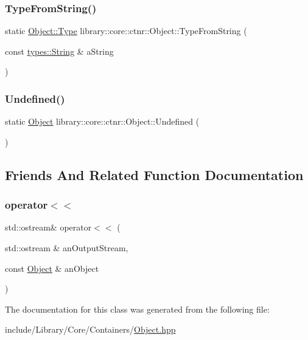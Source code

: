 \subsubsection{\texorpdfstring{Type\+From\+String()}{TypeFromString()}}
{\footnotesize\ttfamily static \hyperlink{classlibrary_1_1core_1_1ctnr_1_1Object_a0766006ad111133d70349019551b31d6}{Object\+::\+Type} library\+::core\+::ctnr\+::\+Object\+::\+Type\+From\+String (\begin{DoxyParamCaption}\item[{const \hyperlink{classlibrary_1_1core_1_1types_1_1String}{types\+::\+String} \&}]{a\+String }\end{DoxyParamCaption})\hspace{0.3cm}{\ttfamily [static]}}

\mbox{\label{classlibrary_1_1core_1_1ctnr_1_1Object_a44ab889938fb505237c87feedd6a6770}} 
\subsubsection{\texorpdfstring{Undefined()}{Undefined()}}
{\footnotesize\ttfamily static \hyperlink{classlibrary_1_1core_1_1ctnr_1_1Object}{Object} library\+::core\+::ctnr\+::\+Object\+::\+Undefined (\begin{DoxyParamCaption}{ }\end{DoxyParamCaption})\hspace{0.3cm}{\ttfamily [static]}}



\subsection{Friends And Related Function Documentation}
\mbox{\label{classlibrary_1_1core_1_1ctnr_1_1Object_a418df9bf4a73078f3d494edef1743f8d}} 
\subsubsection{\texorpdfstring{operator$<$$<$}{operator<<}}
{\footnotesize\ttfamily std\+::ostream\& operator$<$$<$ (\begin{DoxyParamCaption}\item[{std\+::ostream \&}]{an\+Output\+Stream,  }\item[{const \hyperlink{classlibrary_1_1core_1_1ctnr_1_1Object}{Object} \&}]{an\+Object }\end{DoxyParamCaption})\hspace{0.3cm}{\ttfamily [friend]}}



The documentation for this class was generated from the following file\+:\begin{DoxyCompactItemize}
\item 
include/\+Library/\+Core/\+Containers/\hyperlink{Object_8hpp}{Object.\+hpp}\end{DoxyCompactItemize}

